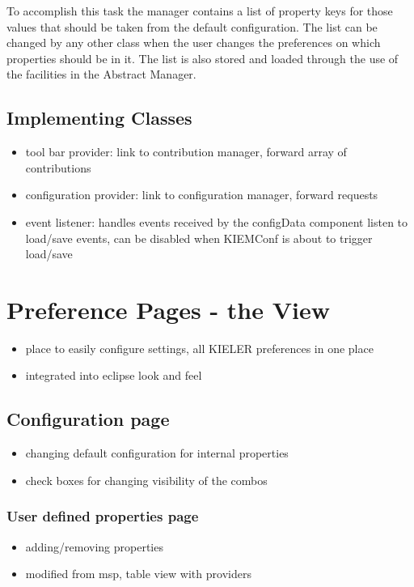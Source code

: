 To accomplish this task the manager contains a list of property keys for those values
that should be taken from the default configuration. The list can be changed by any other
class when the user changes the preferences on which properties should be in it. The list
is also stored and loaded through the use of the facilities in the Abstract Manager.


\subsection{Implementing Classes}
\begin{itemize}
 \item tool bar provider: link to contribution manager, forward array of contributions
 \item configuration provider: link to configuration manager, forward requests
 \item event listener: handles events received by the configData component 
    listen to load/save events, can be disabled when KIEMConf is about to trigger load/save
\end{itemize}

\section{Preference Pages - the View}
\begin{itemize}
 \item place to easily configure settings, all KIELER preferences in one place
 \item integrated into eclipse look and feel
\end{itemize}

\subsection{Configuration page}
\begin{itemize}
 \item changing default configuration for internal properties
 \item check boxes for changing visibility of the combos
\end{itemize}

\subsubsection{User defined properties page}
\begin{itemize}
 \item adding/removing properties
 \item modified from msp, table view with providers
\end{itemize}

